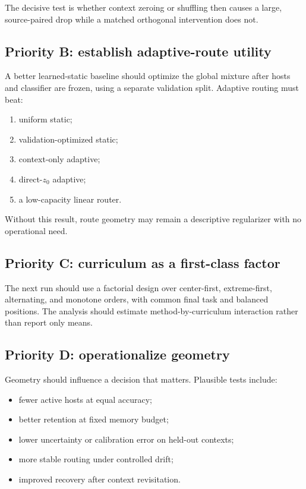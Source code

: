 \documentclass[11pt,a4paper]{article}
\begin{document}
The decisive test is whether context zeroing or shuffling then causes a large, source-paired drop while a matched orthogonal intervention does not.

\subsection{Priority B: establish adaptive-route utility}

A better learned-static baseline should optimize the global mixture after hosts and classifier are frozen, using a separate validation split. Adaptive routing must beat:

\begin{enumerate}
\item uniform static;
\item validation-optimized static;
\item context-only adaptive;
\item direct-$z_0$ adaptive;
\item a low-capacity linear router.
\end{enumerate}

Without this result, route geometry may remain a descriptive regularizer with no operational need.

\subsection{Priority C: curriculum as a first-class factor}

The next run should use a factorial design over center-first, extreme-first, alternating, and monotone orders, with common final task and balanced positions. The analysis should estimate method-by-curriculum interaction rather than report only means.

\subsection{Priority D: operationalize geometry}

Geometry should influence a decision that matters. Plausible tests include:

\begin{itemize}
\item fewer active hosts at equal accuracy;
\item better retention at fixed memory budget;
\item lower uncertainty or calibration error on held-out contexts;
\item more stable routing under controlled drift;
\item improved recovery after context revisitation.
\end{itemize}
\end{document}

